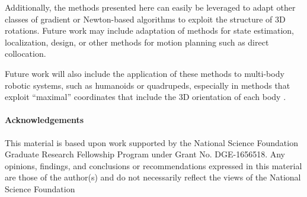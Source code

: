 \documentclass[letterpaper, 10 pt, conference]{ieeeconf}  %
\begin{document}
    Additionally, the methods presented here can easily be leveraged to adapt other classes
    of gradient or Newton-based algorithms to exploit the structure of 3D rotations. Future
    work may include adaptation of methods for state estimation, localization, design, or 
    other methods for motion planning such as direct collocation. 
    
    Future work will also include the application of these methods to multi-body robotic
    systems, such as humanoids or quadrupeds, especially in methods that exploit 
    ``maximal'' coordinates that include the 3D orientation of each body \cite{brudigam2020linear}. 

\paragraph*{Acknowledgements}
This material is based upon work supported by the National Science Foundation Graduate
Research Fellowship Program under Grant No. DGE-1656518. Any opinions, findings, and
conclusions or recommendations expressed in this material are those of the author(s) and
do not necessarily reflect the views of the National Science Foundation


\printbibliography
\end{document}
